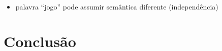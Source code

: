 \documentclass[10pt]{beamer}
\begin{document}
\begin{frame}  [shrink=15]
    \begin{itemize}
      \item palavra ``jogo'' pode assumir semântica diferente (independência)
    \end{itemize}



\end{frame}

\section{Conclusão}

\end{document}
